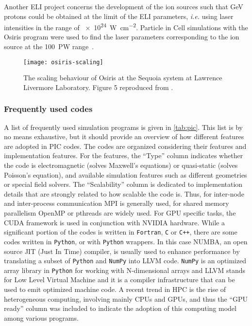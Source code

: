 \documentclass[12pt, class=report, crop=false]{standalone}
\begin{document}
Another ELI project concerns the development of the ion sources such that GeV
protons could be obtained at the limit of the ELI parameters, \emph{i.e.} using
laser intensities in the range of \SI{e24}{\watt\per\square\centi\metre}.
Particle in Cell simulations with the Osiris program were used to find the laser
parameters corresponding to the ion source at the \SI{100}{\peta\watt}
range~\autocite[327]{mourou_eliextreme_2011}.

\begin{figure}[h]
  \texttt{[image: osiris-scaling]}
  \caption{The scaling behaviour of Osiris at the Sequoia system at Lawrence Livermore Laboratory.
  Figure 5 reproduced from \textcite{fonseca_exploitingmultiscale_2013}.}%
  \label{fig:osiris-scaling}%
\end{figure}

\subsubsection{Frequently used codes}

A list of frequently used simulation programs is given in \cref{tab:pic}. This list
is by no means exhaustive, but it should provide an overview of how different
features are adopted in PIC codes. The codes are organized
considering their features and implementation features.
For the features, the ``Type'' column indicates whether
the code is electromagnetic (solves Maxwell's equations)
or quasi-static (solves Poisson's equation), and available
simulation features such as different geometries or special
field solvers. The ``Scalability'' column is dedicated to
implementation details that are strongly related to how
scalable the code is. Thus, for inter-node and inter-process communication
MPI is generally used, for shared memory parallelism OpenMP
or pthreads are widely used. For GPU specific tasks, the
CUDA framework is used in conjunction with NVIDIA hardware.
While a significant portion of the codes is written in \texttt{Fortran}, \texttt{C} or \texttt{C++}, there are some
codes written in \texttt{Python}, or with \texttt{Python} wrappers. In this case NUMBA, an open source JIT (Just In Time) compiler, is usually used to enhance performance by translating a
subset of \texttt{Python} and \texttt{NumPy} into LLVM code.
\texttt{NumPy} is an optimized array library in \texttt{Python} for working with N-dimensional arrays and
LLVM stands for Low Level Virtual Machine and it is a compiler infrastructure that can be used to emit optimized
machine code.
A recent trend in HPC is the rise of
heterogeneous computing, involving mainly CPUs and GPUs, and thus the
``GPU ready'' column was included to indicate the adoption of this computing
model among various programs.
\end{document}
